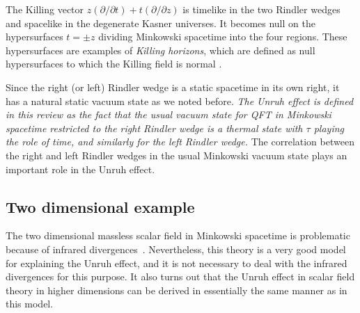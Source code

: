 \documentclass[12pt,nofootinbib,floatfix,aps,prd,showpacs,amsmath,amssymb,eqsecnum]{revtex4-2}
\begin{document}
The Killing vector $z(\partial/\partial t) + t(\partial/\partial z)$ is
timelike in the two Rindler wedges and spacelike in the
degenerate Kasner universes.  It becomes null on 
the hypersurfaces 
$t=\pm z$ dividing Minkowski spacetime into the four regions. 
These hypersurfaces are examples of {\em Killing horizons}, 
which are defined as null hypersurfaces to which the Killing
field is normal \cite{WaldQFTCS}.

Since the right (or left) Rindler wedge
is a static spacetime in its own right, it has a
natural static vacuum state as we noted before.
{\em The Unruh effect is defined in this review as the fact that
the usual vacuum state for QFT in Minkowski spacetime
restricted to the right Rindler wedge is a thermal state 
with $\tau$ playing 
the role of time, and similarly for the left Rindler wedge.}  
The correlation between the right
and left Rindler wedges in the usual Minkowski vacuum state plays an
important role in the Unruh effect.

\subsection{Two dimensional example}
\label{twodimensions}

The two dimensional massless scalar field in Minkowski spacetime is
problematic because of infrared divergences~\cite{Coleman73}. 
Nevertheless, this theory
is a very good model for explaining the Unruh effect,
and it is not necessary to deal with the infrared divergences for this
purpose.  It also turns out that the Unruh effect in scalar
field theory in higher dimensions can be derived in essentially the same
manner as in this model.
\end{document}
